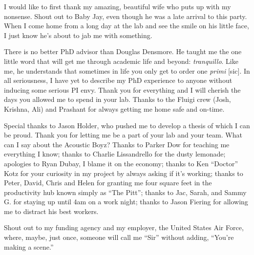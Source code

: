 I would like to first thank my amazing, beautiful wife who puts up with my nonsense. Shout out to Baby Jay, even though he was a late arrival to this party. When I come home from a long day at the lab and see the smile on his little face, I just know he's about to jab me with something.

There is no better PhD advisor than Douglas Densmore. He taught me the one little word that will get me through academic life and beyond: \emph{tranquillo}. Like me, he understands that sometimes in life you only get to order one \emph{primi} [sic]. In all seriousness, I have yet to describe my PhD experience to anyone without inducing some serious PI envy. Thank you for everything and I will cherish the days you allowed me to spend in your lab. Thanks to the Fluigi crew (Josh, Krishna, Ali) and Prashant for always getting me home safe and on-time.

Special thanks to Jason Holder, who pushed me to develop a thesis of which I can be proud. Thank you for letting me be a part of your lab and your team. What can I say about the Acoustic Boyz? Thanks to Parker Dow for teaching me everything I know; thanks to Charlie Lissandrello for the dusty lemonade; apologies to Ryan Dubay, I blame it on the economy; thanks to Ken ``Doctor'' Kotz for your curiosity in my project by always asking if it's working; thanks to Peter, David, Chris and Helen for granting me four square feet in the productivity hub known simply as ``The Pitt''; thanks to Jac, Sarah, and Sammy G. for staying up until 4am on a work night; thanks to Jason Fiering for allowing me to distract his best workers.


Shout out to my funding agency and my employer, the United States Air Force, where, maybe, just once, someone will call me ``Sir'' without adding, ``You're making a scene.''
